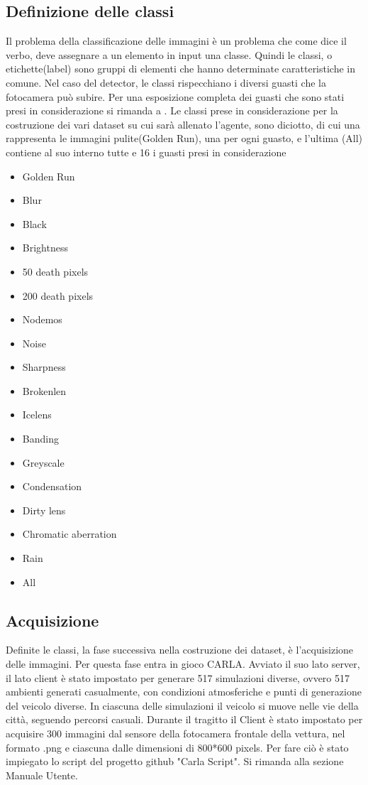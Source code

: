 \documentclass[14pt]{extarticle}
\begin{document}
\subsection{Definizione delle classi}
Il problema della classificazione delle immagini è un problema che come dice il verbo, deve assegnare a un elemento in input una classe.
Quindi le classi, o etichette(label) sono gruppi di elementi che hanno determinate caratteristiche in comune.%
Nel caso del detector,  le classi rispecchiano i diversi guasti che la fotocamera può subire. Per una esposizione completa dei guasti che sono stati presi in considerazione si rimanda a \cite{secci2020failures}.
Le classi prese in considerazione per la costruzione dei vari dataset su cui sarà allenato l'agente, sono diciotto, di cui una rappresenta le immagini pulite(Golden Run), una per ogni guasto, e l'ultima (All) contiene al suo interno tutte e 16 i guasti presi in considerazione
\begin{multicols}{3}
\begin{itemize}
\item Golden Run
\item Blur
\item Black
\item Brightness
\item 50 death pixels
\item 200 death pixels
\item Nodemos
\item Noise
\item Sharpness
\item Brokenlen
\item Icelens
\item Banding
\item Greyscale
\item Condensation
\item Dirty lens
\item Chromatic aberration
\item Rain
\item All
\end{itemize}
\end{multicols}


\subsection{Acquisizione}
Definite le classi, la fase successiva nella costruzione dei dataset, è l'acquisizione delle immagini.
Per questa fase entra in gioco CARLA. Avviato il suo lato server, il lato client è stato impostato per generare 517 simulazioni diverse, ovvero 517 ambienti generati casualmente, con condizioni atmosferiche  e punti di generazione del veicolo diverse. In ciascuna delle simulazioni il veicolo si muove nelle vie della città, seguendo percorsi casuali. Durante il tragitto il Client è stato impostato per acquisire 300 immagini dal sensore della fotocamera frontale della vettura, nel formato .png e ciascuna dalle  dimensioni di 800*600 pixels.
Per fare ciò è stato impiegato lo script del progetto github "Carla Script". Si rimanda alla sezione Manuale Utente.
\end{document}
